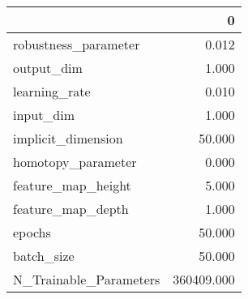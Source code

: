\begin{tabular}{lr}
\toprule
{} &           0 \\
\midrule
robustness\_parameter   &       0.012 \\
output\_dim             &       1.000 \\
learning\_rate          &       0.010 \\
input\_dim              &       1.000 \\
implicit\_dimension     &      50.000 \\
homotopy\_parameter     &       0.000 \\
feature\_map\_height     &       5.000 \\
feature\_map\_depth      &       1.000 \\
epochs                 &      50.000 \\
batch\_size             &      50.000 \\
N\_Trainable\_Parameters &  360409.000 \\
\bottomrule
\end{tabular}
